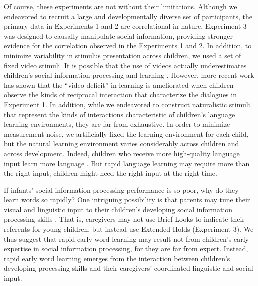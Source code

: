 \documentclass{pnastwo}
\begin{document}
\begin{article}
Of course, these experiments are not without their limitations. Although we endeavored to recruit a large and developmentally diverse set of participants, the primary data in Experiments 1 and 2 are correlational in nature. Experiment 3 was designed to causally manipulate social information, providing stronger evidence for the correlation observed in the Experiments 1 and 2. In addition, to minimize variability in stimulus presentation across children, we used a set of fixed video stimuli. It is possible that the use of videos actually underestimates children's social information processing and learning \citep{anderson2005}. However, more recent work has shown that the ``video deficit'' in learning is ameliorated when children observe the kinds of reciprocal interaction that characterize the dialogues in Experiment 1. In addition, while we endeavored to construct naturalistic stimuli that represent the kinds of interactions characteristic of children's language learning environments, they are far from exhaustive. In order to minimize measurement noise, we artificially fixed the learning environment for each child, but the natural learning environment varies considerably across children and across development. Indeed, children who receive more high-quality language input learn more language \citep{weisleder2013}. But rapid language learning may require more than the right input; children might need the right input at the right time.

If infants' social information processing performance is so poor, why do they learn words so rapidly? One intriguing possibility is that parents may tune their visual and linguistic input to their children's developing social information processing skills \citep{snow1972,gogate2000,brand2002}. That is, caregivers may not use Brief Looks to indicate their referents for young children, but instead use Extended Holds (Experiment 3). We thus suggest that rapid early word learning may result not from children's early expertise in social information processing, for they are far from expert. Instead, rapid early word learning emerges from the interaction between children's developing processing skills and their caregivers' coordinated linguistic and social input.

\begin{materials}


\end{materials}
\end{article}
\end{document}

